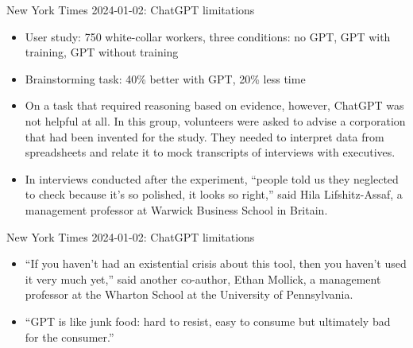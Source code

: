 \begin{vbframe}{New York Times 2024-01-02: ChatGPT limitations}

\vfill

\begin{itemize}
\item User study: 750 white-collar workers, three
        conditions: no GPT, GPT with training, GPT without
        training


\item Brainstorming task: 40\% better with GPT, 20\% less time


	\item
        On a task that required reasoning based on evidence,
        however, ChatGPT was not helpful at all. In this
        group, volunteers were asked to advise a corporation
        that had been invented for the study. They needed to
        interpret data from spreadsheets and relate it to
        mock transcripts of interviews with executives.


	\item In interviews conducted after the experiment,
	“people told us they neglected to check because it’s
	so polished, it looks so right,” said Hila
	Lifshitz-Assaf, a management professor at Warwick
	Business School in Britain.
 




\end{itemize}


\vfill

\end{vbframe}


\begin{vbframe}{New York Times 2024-01-02: ChatGPT limitations}

\vfill

\begin{itemize}
 

	\item
“If you haven’t had an existential crisis about this tool,
then you haven’t used it very much yet,” said another
co-author, Ethan Mollick, a management professor at the
Wharton School at the University of Pennsylvania.

\item “GPT is like junk food: hard to resist, easy to
consume but ultimately bad for the consumer.”


\end{itemize}


\vfill

\end{vbframe}


